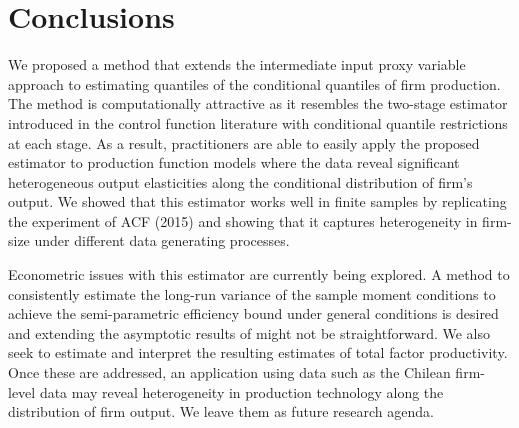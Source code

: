 \documentclass[11pt]{article}
\begin{document}
\section{Conclusions} \label{conclusion}

We proposed a method that extends the intermediate input proxy variable approach to estimating quantiles of the conditional quantiles of firm production. The method is computationally attractive as it resembles the two-stage estimator introduced in the control function literature with conditional quantile restrictions at each stage. As a result, practitioners are able to easily apply the proposed estimator to production function models where the data reveal significant heterogeneous output elasticities along the conditional distribution of firm's output. We showed that this estimator works well in finite samples by replicating the experiment of ACF (2015) and showing that it captures heterogeneity in firm-size under different data generating processes.  

Econometric issues with this estimator are currently being explored. A method to consistently estimate the long-run variance of the sample moment conditions to achieve the semi-parametric efficiency bound under general conditions is desired and extending the asymptotic results of \cite*{qgmm} might not be straightforward. We also seek to estimate and interpret the resulting estimates of total factor productivity. Once these are addressed, an application using data such as the Chilean firm-level data may reveal heterogeneity in production technology along the distribution of firm output. 
We leave them as future research agenda.


\pagebreak
\newpage











\end{document}
